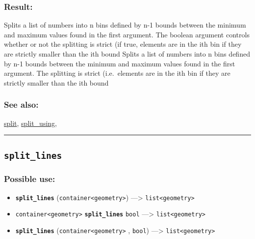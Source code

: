 \documentclass[]{book}
\providecommand{\tightlist}{%
  \setlength{\itemsep}{0pt}\setlength{\parskip}{0pt}}
\theoremstyle{definition}
\theoremstyle{definition}
\theoremstyle{definition}
\theoremstyle{remark}
\begin{document}
\subsubsection{Result:}\label{result-478}

Splits a list of numbers into n bins defined by n-1 bounds between the
minimum and maximum values found in the first argument. The boolean
argument controls whether or not the splitting is strict (if true,
elements are in the ith bin if they are strictly smaller than the ith
bound Splits a list of numbers into n bins defined by n-1 bounds between
the minimum and maximum values found in the first argument. The
splitting is strict (i.e.~elements are in the ith bin if they are
strictly smaller than the ith bound

\subsubsection{See also:}\label{see-also-193}

\href{OperatorsSZ\#split}{split},
\href{OperatorsSZ\#split_using}{split\_using},

\begin{center}\rule{0.5\linewidth}{\linethickness}\end{center}

\subsection{\texorpdfstring{\texttt{split\_lines}}{split\_lines}}\label{split_lines}

\subsubsection{Possible use:}\label{possible-use-495}

\begin{itemize}
\tightlist
\item
  \textbf{\texttt{split\_lines}}
  (\texttt{container\textless{}geometry\textgreater{}})
  ---\textgreater{} \texttt{list\textless{}geometry\textgreater{}}
\item
  \texttt{container\textless{}geometry\textgreater{}}
  \textbf{\texttt{split\_lines}} \texttt{bool} ---\textgreater{}
  \texttt{list\textless{}geometry\textgreater{}}
\item
  \textbf{\texttt{split\_lines}}
  (\texttt{container\textless{}geometry\textgreater{}} , \texttt{bool})
  ---\textgreater{} \texttt{list\textless{}geometry\textgreater{}}
\end{itemize}
\end{document}
